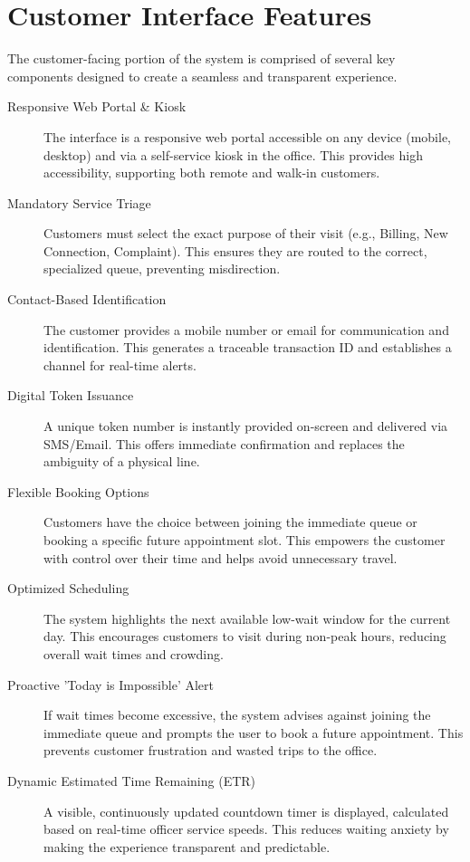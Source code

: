 \documentclass{article}
\begin{document}
\section{Customer Interface Features}

The customer-facing portion of the system is comprised of several key components designed to create a seamless and transparent experience.

\begin{description}
    \item[Responsive Web Portal \& Kiosk] The interface is a responsive web portal accessible on any device (mobile, desktop) and via a self-service kiosk in the office. This provides high accessibility, supporting both remote and walk-in customers.
    \item[Mandatory Service Triage] Customers must select the exact purpose of their visit (e.g., Billing, New Connection, Complaint). This ensures they are routed to the correct, specialized queue, preventing misdirection.
    \item[Contact-Based Identification] The customer provides a mobile number or email for communication and identification. This generates a traceable transaction ID and establishes a channel for real-time alerts.
    \item[Digital Token Issuance] A unique token number is instantly provided on-screen and delivered via SMS/Email. This offers immediate confirmation and replaces the ambiguity of a physical line.
    \item[Flexible Booking Options] Customers have the choice between joining the immediate queue or booking a specific future appointment slot. This empowers the customer with control over their time and helps avoid unnecessary travel.
    \item[Optimized Scheduling] The system highlights the next available low-wait window for the current day. This encourages customers to visit during non-peak hours, reducing overall wait times and crowding.
    \item[Proactive 'Today is Impossible' Alert] If wait times become excessive, the system advises against joining the immediate queue and prompts the user to book a future appointment. This prevents customer frustration and wasted trips to the office.
    \item[Dynamic Estimated Time Remaining (ETR)] A visible, continuously updated countdown timer is displayed, calculated based on real-time officer service speeds. This reduces waiting anxiety by making the experience transparent and predictable.

\end{description}
\end{document}
